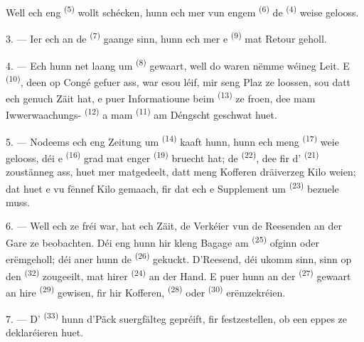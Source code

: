 Well ech eng  \textsuperscript{(5)} wollt schécken, hunn
ech mer vun engem  \textsuperscript{(6)} de
 \textsuperscript{(4)} weise gelooss.

3. --- Ier ech an de  \textsuperscript{(7)} gaange sinn, hunn ech
mer e  \textsuperscript{(9)} mat Retour geholl.

4. --- Ech hunn net laang um  \textsuperscript{(8)} gewaart, well do
waren nëmme wéineg Leit. E  \textsuperscript{(10)}, deen op Congé
gefuer ass, war esou léif, mir seng Plaz ze loossen, sou datt ech genuch Zäit hat, e
puer Informatioune beim  \textsuperscript{(13)} ze froen, dee mam
Iwwerwaachungs- \textsuperscript{(12)} a mam 
\textsuperscript{(11)} am Déngscht geschwat huet.

\VUsaut{3.0mm}

5. --- Nodeems ech eng Zeitung um  \textsuperscript{(14)} kaaft
hunn, hunn ech meng  \textsuperscript{(17)} weie gelooss, déi e
 \textsuperscript{(16)} grad mat enger 
\textsuperscript{(19)} bruecht hat; de  \textsuperscript{(22)}, dee
fir d' \textsuperscript{(21)} zoustänneg ass, huet mer matgedeelt, datt
meng Kofferen dräiverzeg Kilo weien; dat huet e  vu fënnef Kilo
gemaach, fir dat ech e Supplement um  \textsuperscript{(23)}
bezuele muss.

6. --- Well ech ze fréi war, hat ech Zäit, de Verkéier vun de Reesenden an der Gare
ze beobachten. Déi eng hunn hir kleng Bagage am 
\textsuperscript{(25)} ofginn oder erëmgeholl; déi aner hunn de 
\textsuperscript{(26)} gekuckt. D'Reesend, déi ukomm sinn, sinn op den
 \textsuperscript{(32)} zougeeilt, mat hirer 
\textsuperscript{(24)} an der Hand. E puer hunn an der 
\textsuperscript{(27)} gewaart an hire  \textsuperscript{(29)}
gewisen, fir hir Kofferen,  \textsuperscript{(28)} oder
 \textsuperscript{(30)} erëmzekréien.

7. --- D' \textsuperscript{(33)} hunn d'Päck suergfälteg
gepréift, fir festzestellen, ob een eppes ze deklaréieren huet.

